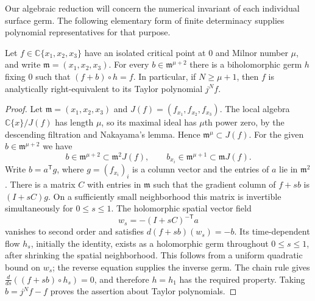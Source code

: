 Our algebraic reduction will concern the numerical invariant of each
individual surface germ.  The following elementary form of finite
determinacy supplies polynomial representatives for that purpose.

\begin{lemma}
\label{lem:individual-jets}
Let $f\in\mathbb C\{x_1,x_2,x_3\}$ have an isolated critical point at $0$
and Milnor number $\mu$, and write $\mathfrak m=(x_1,x_2,x_3)$.
For every $b\in\mathfrak m^{\mu+2}$ there is a biholomorphic germ $h$
fixing $0$ such that $(f+b)\circ h=f$.  In particular, if
$N\geq\mu+1$, then $f$ is analytically right-equivalent to its Taylor
polynomial $j^Nf$.
\end{lemma}

\begin{proof}
Let $\mathfrak m=(x_1,x_2,x_3)$ and $J(f)=(f_{x_1},f_{x_2},f_{x_3})$.
The local algebra $\mathbb C\{x\}/J(f)$ has length $\mu$, so its maximal
ideal has $\mu$th power zero, by the descending filtration and
Nakayama's lemma.  Hence $\mathfrak m^\mu\subset J(f)$.
For the given $b\in\mathfrak m^{\mu+2}$ we have
\[
 b\in\mathfrak m^{\mu+2}\subset\mathfrak m^2J(f),
 \qquad
 b_{x_i}\in\mathfrak m^{\mu+1}\subset\mathfrak m J(f).
\]
Write $b=a^{\mathsf T}g$, where $g=(f_{x_i})_i$ is a column vector and
the entries of $a$ lie in $\mathfrak m^2$.  There is a matrix $C$ with
entries in $\mathfrak m$ such that the gradient column of $f+sb$ is
$(I+sC)g$.  On a sufficiently small neighborhood this matrix is
invertible simultaneously for $0\leq s\leq1$.  The holomorphic spatial
vector field
\[
 w_s=-(I+sC)^{-\mathsf T}a
\]
vanishes to second order and satisfies $d(f+sb)(w_s)=-b$.
Its time-dependent flow $h_s$, initially the identity, exists as a
holomorphic germ throughout $0\leq s\leq1$, after shrinking the spatial
neighborhood.  This follows from a uniform quadratic bound on $w_s$;
the reverse equation supplies the inverse germ.  The chain rule gives
$\frac{d}{ds}((f+sb)\circ h_s)=0$, and therefore $h=h_1$ has the
required property.  Taking $b=j^Nf-f$ proves the assertion about Taylor
polynomials.
\end{proof}

